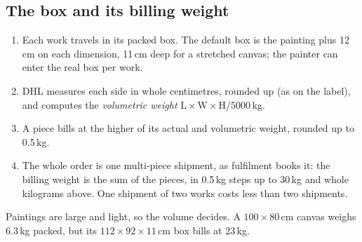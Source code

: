 \documentclass[11pt,a4paper]{article}
\begin{document}
\subsection{The box and its billing weight}
\begin{enumerate}
  \item Each work travels in its packed box. The default box is the painting plus 12\,cm on each
    dimension, 11\,cm deep for a stretched canvas; the painter can enter the real box per work.
  \item DHL measures each side in whole centimetres, rounded up (as on the label), and computes
    the \emph{volumetric weight} $\text{L}\times\text{W}\times\text{H}/5000$\,kg.
  \item A piece bills at the higher of its actual and volumetric weight, rounded up to 0.5\,kg.
  \item The whole order is one multi-piece shipment, as fulfilment books it: the billing weight is
    the sum of the pieces, in 0.5\,kg steps up to 30\,kg and whole kilograms above. One shipment
    of two works costs less than two shipments.
\end{enumerate}
Paintings are large and light, so the volume decides. A $100\times80$\,cm canvas weighs 6.3\,kg
packed, but its $112\times92\times11$\,cm box bills at 23\,kg.
\end{document}
